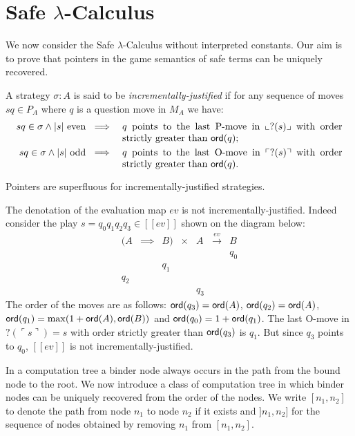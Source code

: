 \documentclass{llncs}
\newcommand\ord[1]{{\sf ord}(#1)}
\newcommand{\lsem}{[\![} %
\newcommand{\rsem}{]\!]} %
\newcommand{\sem}[1]{{\lsem #1 \rsem}}
\newcommand{\oview}[1]{\llcorner #1 \lrcorner}
\newcommand{\pview}[1]{\ulcorner #1 \urcorner}
\begin{document}
\section{Safe $\lambda$-Calculus}
We now consider the Safe $\lambda$-Calculus without interpreted
constants. Our aim is to prove that pointers in the game semantics
of safe terms can be uniquely recovered.

\begin{definition}
A strategy $\sigma : A$ is said to be \emph{incrementally-justified}
if for any sequence of moves $s q \in P_A$ where $q$ is a question
move in $M_A$ we have:
\begin{eqnarray*}
s q \in \sigma \wedge |s| \mbox{ even } &\implies& \parbox[t]{8cm}{$q$ points to the last P-move in $\oview{?(s)}$ with order strictly greater than $\ord{q}$;} \\
s q \in \sigma \wedge |s| \mbox{ odd } &\implies&
\parbox[t]{8cm}{$q$  points to the last O-move in $\pview{?(s)}$
with order strictly greater than $\ord{q}$.}
\end{eqnarray*}
\end{definition}

\begin{lemma}
\label{lem:incrjustified_pointers_uniqu_recover} Pointers are
superfluous for incrementally-justified strategies.
\end{lemma}

\begin{example}
The denotation of the evaluation map $ev$ is not
incrementally-justified. Indeed consider the play $s = q_0 q_1 q_2
q_3 \in \sem{ev}$ shown on the diagram below:
$$\begin{array}{cccccccc}
(A & \implies & B) & \times  & A & \stackrel{ev}{\longrightarrow} & B \\
&&&&&& q_0 \\
&& q_1 \\
 q_2 \\
 &&&&q_3
\end{array}$$
The order of the moves are as follows:  $\ord{q_3} = \ord{A}$,
$\ord{q_2} = \ord{A}$, $\ord{q_1} = \max( 1+\ord{A}, \ord{B})$ and
$\ord{q_0} = 1 + \ord{q_1}$. The last O-move in $?(\pview{s})= s$
with order strictly greater than $\ord{q_3}$ is $q_1$.
 But since $q_3$ points to $q_0$, $\sem{ev}$ is not incrementally-justified.
\end{example}


In a computation tree a binder node always occurs in the path from
the bound node to the root. We now introduce a class of computation
tree in which binder nodes can be uniquely recovered from the order
of the nodes. We write $[n_1,n_2]$ to denote the path from node
$n_1$ to node $n_2$ if it exists and $]n_1,n_2]$ for the sequence of
nodes obtained by removing $n_1$ from $[n_1,n_2]$.
\end{document}
